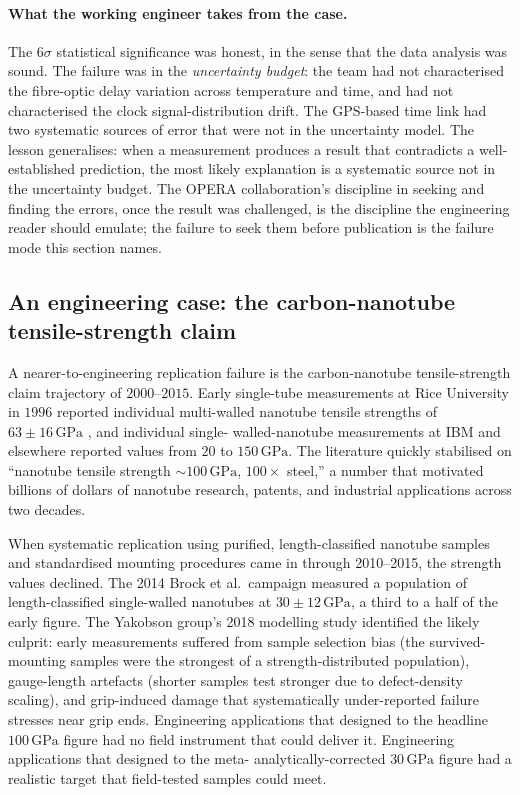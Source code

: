 \paragraph{What the working engineer takes from the case.} The
$6\sigma$ statistical significance was honest, in the sense that
the data analysis was sound. The failure was in the
\emph{uncertainty budget}: the team had not characterised the
fibre-optic delay variation across temperature and time, and
had not characterised the clock signal-distribution drift. The
GPS-based time link had two systematic sources of error that
were not in the uncertainty model. The lesson generalises:
when a measurement produces a result that contradicts a
well-established prediction, the most likely explanation is
a systematic source not in the uncertainty budget. The OPERA
collaboration's discipline in seeking and finding the errors,
once the result was challenged, is the discipline the
engineering reader should emulate; the failure to seek them
before publication is the failure mode this section names.

\subsection{An engineering case: the carbon-nanotube tensile-strength claim}

A nearer-to-engineering replication failure is the
carbon-nanotube tensile-strength claim trajectory of
$2000$--$2015$. Early single-tube measurements at Rice
University in $1996$ reported individual multi-walled
nanotube tensile strengths of $63 \pm 16 \,\si{\giga\pascal}$
\cite{paper:ch08t3p-yu-rice-2000}, and individual single-
walled-nanotube measurements at IBM and elsewhere reported
values from $20$ to $150 \,\si{\giga\pascal}$. The literature
quickly stabilised on ``nanotube tensile strength
$\sim 100 \,\si{\giga\pascal}$, $100\times$ steel,'' a number
that motivated billions of dollars of nanotube research,
patents, and industrial applications across two decades.

When systematic replication using purified, length-classified
nanotube samples and standardised mounting procedures came in
through 2010--2015, the strength values declined. The 2014
Brock et al.\ campaign \cite{paper:ch08t3p-brock-cnt-2014}
measured a population of length-classified single-walled
nanotubes at $30 \pm 12 \,\si{\giga\pascal}$, a third to a
half of the early figure. The Yakobson group's 2018 modelling
study \cite{paper:ch08t3p-yakobson-cnt-2018} identified the
likely culprit: early measurements suffered from sample
selection bias (the survived-mounting samples were the
strongest of a strength-distributed population), gauge-length
artefacts (shorter samples test stronger due to defect-density
scaling), and grip-induced damage that systematically
under-reported failure stresses near grip ends. Engineering
applications that designed to the headline $100 \,\si{\giga
\pascal}$ figure had no field instrument that could deliver
it. Engineering applications that designed to the meta-
analytically-corrected $30 \,\si{\giga\pascal}$ figure had a
realistic target that field-tested samples could meet.

